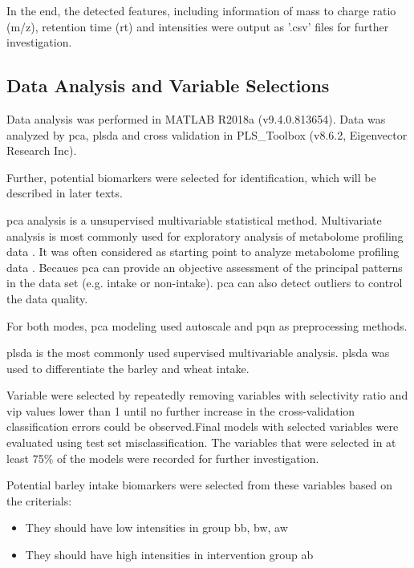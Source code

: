    In the end, the detected features, including information of mass to charge ratio (m/z), retention time (rt) and intensities were output as '.csv' files for further investigation.
    
\subsection{Data Analysis and Variable Selections}
Data analysis was performed in MATLAB R2018a (v9.4.0.813654). 
Data was analyzed by \acrfull{pca}, \acrfull{plsda} and cross validation in PLS\_Toolbox (v8.6.2, Eigenvector Research Inc).

Further, potential biomarkers were selected for identification, which will be described in later texts.

    \acrshort{pca} analysis is a unsupervised multivariable statistical method. Multivariate analysis is most commonly used for exploratory analysis of metabolome profiling data \cite{Worley2013UtilitiesPlots.}. It was often considered as starting point to analyze metabolome profiling data \cite{Scalbert2014}. Becaues \acrshort{pca} can provide an objective assessment of the principal patterns in the data set (e.g. intake or non-intake)\cite{Scalbert2014}. \acrshort{pca} can also detect outliers to control the data quality\cite{gurdenizdata}.
    
    For both modes, \acrshort{pca} modeling used autoscale and \acrfull{pqn} as preprocessing methods.
    
    \acrshort{plsda} is the most commonly used supervised multivariable analysis\cite{Scalbert2014}. 
    \acrshort{plsda} was used to differentiate the barley and wheat intake.
    
    Variable were selected by repeatedly removing variables with selectivity ratio and \acrfull{vip} values lower than 1 until no further increase in the cross-validation classification errors could be observed.Final models with selected variables were evaluated using test set misclassification. The variables that were selected in at least 75\% of the models were recorded for further investigation.
    
    Potential barley intake biomarkers were selected from these variables based on the criterials:
    \begin{itemize}

        \item They should have low intensities in group \acrfull{bb}, \acrfull{bw}, \acrfull{aw}
        \item They should have high intensities in intervention group \acrfull{ab}
    \end{itemize}


